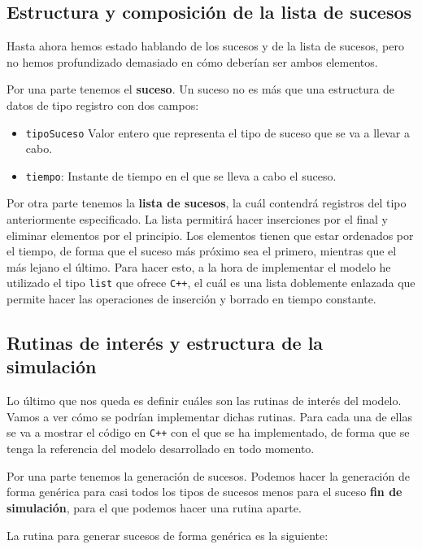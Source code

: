 \documentclass[11pt,a4paper]{article}
\begin{document}
\subsection{Estructura y composición de la lista de sucesos}

Hasta ahora hemos estado hablando de los sucesos y de la lista de sucesos, pero no hemos
profundizado demasiado en cómo deberían ser ambos elementos.

Por una parte tenemos el \textbf{suceso}. Un suceso no es más que una estructura de datos de
tipo registro con dos campos:

\begin{itemize}[label=\textbullet]
	\item \texttt{tipoSuceso} Valor entero que representa el tipo de suceso que se va a llevar
	a cabo.
	\item \texttt{tiempo}: Instante de tiempo en el que se lleva a cabo el suceso.
\end{itemize}

Por otra parte tenemos la \textbf{lista de sucesos}, la cuál contendrá registros del tipo anteriormente
especificado. La lista permitirá hacer inserciones por el final y eliminar elementos por el principio.
Los elementos tienen que estar ordenados por el tiempo, de forma que el suceso más próximo sea
el primero, mientras que el más lejano el último. Para hacer esto, a la hora de implementar el modelo
he utilizado el tipo \texttt{list} que ofrece \texttt{C++}, el cuál es una lista doblemente enlazada
que permite hacer las operaciones de inserción y borrado en tiempo constante. 

\subsection{Rutinas de interés y estructura de la simulación}

Lo último que nos queda es definir cuáles son las rutinas de interés del modelo. Vamos a ver
cómo se podrían implementar dichas rutinas. Para cada una de ellas se va a mostrar el código
en \texttt{C++} con el que se ha implementado, de forma que se tenga la referencia del modelo
desarrollado en todo momento.

Por una parte tenemos la generación de sucesos. Podemos hacer la generación de forma genérica
para casi todos los tipos de sucesos menos para el suceso \textbf{fin de simulación}, para el
que podemos hacer una rutina aparte.

La rutina para generar sucesos de forma genérica es la siguiente:
\end{document}
